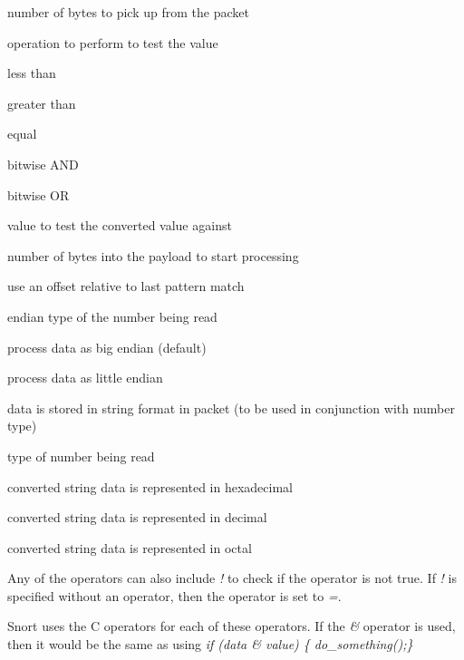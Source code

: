\documentclass[english]{report}
\newenvironment{note}{
    \vspace{10pt}{\textsf{
        {\Huge{$\triangle$\hspace{-12.5pt}{\Large{$^!$}}}}\hspace{5pt}
        {\Large{NOTE}}
    }
    }

    \begin{center}
    \par\vspace{-10pt}
    \begin{lrbox}{\savepar}
    \begin{minipage}[r]{6.2in}
}
{
    \end{minipage}
    \end{lrbox}
    \fbox{
        \usebox{
            \savepar
        }
    }
    \par\vskip10pt
    \end{center}
}
\begin{document}
\begin{description}{}
	\item [bytes to convert]number of bytes to pick up from the packet
	\item [operator]operation to perform to test the value
	\begin{description}{}
		\item [<] less than
		\item [>] greater than
		\item [=] equal
		\item [\&] bitwise AND
		\item [\^] bitwise OR
	\end{description}
	\item [value]value to test the converted value against
	\item [offset]number of bytes into the payload to start processing
	\item [relative]use an offset relative to last pattern match
	\item [endian] endian type of the number being read
	\begin{description}{}
		\item [big]process data as big endian (default)
		\item [little]process data as little endian 
	\end{description}
	
	\item [string] data is stored in string format in packet (to be used in conjunction with number type)
	\item [number type] type of number being read
	\begin{description}{}
		\item [hex]converted string data is represented in hexadecimal
		\item [dec]converted string data is represented in decimal
		\item [oct]converted string data is represented in octal
	\end{description}
\end{description}

Any of the operators can also include \emph{!} to check if the operator is not true.  If \emph{!} is specified without an operator, then the operator is set to \emph{=}.

\begin{note}
Snort uses the C operators for each of these operators.  If the \emph{\&} operator is used, then it would be the same as using \emph{if (data \& value) \{ do\_something();\} }
\end{note}
\end{document}
